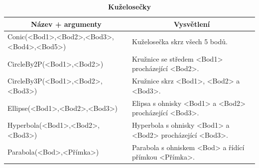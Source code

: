 \documentclass[11pt]{article}
\begin{document}
    \begin{table}[!htb]
    \begin{center}
        \caption{\bf Kuželosečky}
        \begin{tabularx}{\linewidth}{|l|X|}
            \hline 
            \multicolumn{1}{|c|}{\textbf{Název + argumenty}} & \multicolumn{1}{c|}{\textbf{Vysvětlení}}\\
            \hline

            Conic(<Bod1>,<Bod2>,<Bod3>,<Bod4>,<Bod5>) & Kuželosečka skrz všech 5 bodů. \\
            \hline
            CircleBy2P(<Bod1>,<Bod2>) & Kružnice se středem <Bod1> procházející <Bod2>. \\
            \hline
            CircleBy3P(<Bod1>,<Bod2>,<Bod3>) & Kružnice skrz <Bod1>, <Bod2> a <Bod3>. \\
            \hline
            Ellipse(<Bod1>,<Bod2>,<Bod3>) & Elipsa s ohnisky <Bod1> a <Bod2> procházející <Bod3>. \\
            \hline
            Hyperbola(<Bod1>,<Bod2>,<Bod3>) & Hyperbola s ohnisky <Bod1> a <Bod2> procházející <Bod3>. \\
            \hline
            Parabola(<Bod>,<Přímka>) & Parabola s ohniskem <Bod> a řídící přímkou <Přímka>. \\
            \hline
        \end{tabularx}
    \end{center}
    \end{table}
\end{document}
